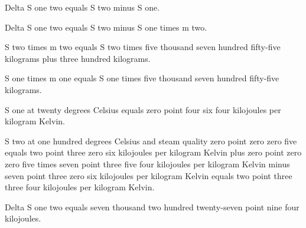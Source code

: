 Delta S one two equals S two minus S one.  

Delta S one two equals S two minus S one times m two.  

S two times m two equals S two times five thousand seven hundred fifty-five kilograms plus three hundred kilograms.  

S one times m one equals S one times five thousand seven hundred fifty-five kilograms.  

S one at twenty degrees Celsius equals zero point four six four kilojoules per kilogram Kelvin.  

S two at one hundred degrees Celsius and steam quality zero point zero zero five equals two point three zero six kilojoules per kilogram Kelvin plus zero point zero zero five times seven point three five four kilojoules per kilogram Kelvin minus seven point three zero six kilojoules per kilogram Kelvin equals two point three three four kilojoules per kilogram Kelvin.  

Delta S one two equals seven thousand two hundred twenty-seven point nine four kilojoules.